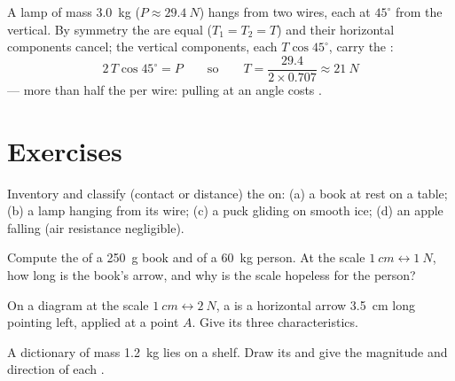 \begin{example}\label{ex:g10:inertia:lamp}
A lamp of mass \qty{3.0}{kg} ($P \approx \qty{29.4}{N}$) hangs from two
wires, each at $45^\circ$ from the vertical. By symmetry the 
are equal ($T_1 = T_2 = T$) and their horizontal components cancel; the
vertical components, each $T \cos 45^\circ$, carry the :
\[
2\,T \cos 45^\circ = P
\qquad\text{so}\qquad
T = \frac{29.4}{2 \times 0.707} \approx \qty{21}{N}
\]
--- more than half the  per wire: pulling at an angle costs
.
\end{example}

\section{Exercises}

\begin{exercise}[$\star$]\label{exo:g10:inertia:1}
Inventory and classify (contact or distance) the  on: (a) a book
at rest on a table; (b) a lamp hanging from its wire; (c) a puck
gliding on smooth ice; (d) an apple falling (air resistance
negligible).
\end{exercise}

\begin{exercise}[$\star$]\label{exo:g10:inertia:2}
Compute the  of a \qty{250}{g} book and of a \qty{60}{kg}
person. At the scale $\qty{1}{cm} \leftrightarrow \qty{1}{N}$, how
long is the book's arrow, and why is the scale hopeless for the
person?
\end{exercise}

\begin{exercise}[$\star$]\label{exo:g10:inertia:3}
On a diagram at the scale $\qty{1}{cm} \leftrightarrow \qty{2}{N}$, a
 is a horizontal arrow \qty{3.5}{cm} long pointing left, applied
at a point $A$. Give its three characteristics.
\end{exercise}

\begin{exercise}[$\star$]\label{exo:g10:inertia:4}
A dictionary of mass \qty{1.2}{kg} lies on a shelf. Draw its  and give the magnitude and direction of each .
\end{exercise}

